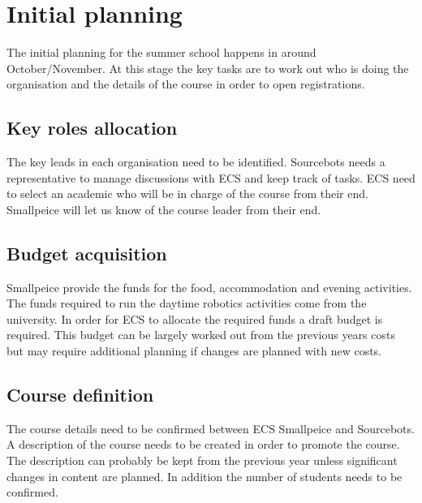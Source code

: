 \section{Initial planning}

The initial planning for the summer school happens in around October/November.
At this stage the key tasks are to work out who is doing the organisation and the details of the course in order to open registrations.

\subsection{Key roles allocation}

The key leads in each organisation need to be identified.
Sourcebots needs a representative to manage discussions with ECS and keep track of tasks.
ECS need to select an academic who will be in charge of the course from their end.
Smallpeice will let us know of the course leader from their end.


\subsection{Budget acquisition}

Smallpeice provide the funds for the food, accommodation and evening activities.
The funds required to run the daytime robotics activities come from the university.
In order for ECS to allocate the required funds a draft budget is required.
This budget can be largely worked out from the previous years costs but may require additional planning if changes are planned with new costs.


\subsection{Course definition}

The course details need to be confirmed between ECS Smallpeice and Sourcebots.
A description of the course needs to be created in order to promote the course.
The description can probably be kept from the previous year unless significant changes in content are planned.
In addition the number of students needs to be confirmed.

